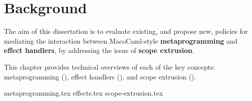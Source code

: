 \chapter{Background}
The aim of this dissertation is to evaluate existing, and propose new, policies for mediating the interaction between MacoCaml-style \textbf{metaprogramming} and \textbf{effect handlers}, by addressing the issue of \textbf{scope extrusion}.

This chapter provides technical overviews of each of the key concepts: metaprogramming (), effect handlers (), and scope extrusion ().

{metaprogramming.tex}
{effects.tex}
{scope-extrusion.tex}
